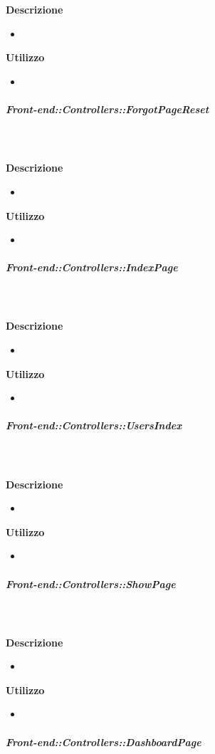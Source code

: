         \textbf{\\ \\ Descrizione} 
          \begin{itemize}
            \item[] 
          \end{itemize}      
        \textbf{Utilizzo}  
          \begin{itemize}
            \item[] 
          \end{itemize}
      \subparagraph{Front-end::Controllers::ForgotPageReset}
        
        \textbf{\\ \\ Descrizione} 
          \begin{itemize}
            \item[] 
          \end{itemize}      
        \textbf{Utilizzo}  
          \begin{itemize}
            \item[] 
          \end{itemize}
      \subparagraph{Front-end::Controllers::IndexPage}
        
        \textbf{\\ \\ Descrizione} 
          \begin{itemize}
            \item[] 
          \end{itemize}      
        \textbf{Utilizzo}  
          \begin{itemize}
            \item[] 
          \end{itemize}
      \subparagraph{Front-end::Controllers::UsersIndex}
        
        \textbf{\\ \\ Descrizione} 
          \begin{itemize}
            \item[] 
          \end{itemize}      
        \textbf{Utilizzo}  
          \begin{itemize}
            \item[] 
          \end{itemize}
      \subparagraph{Front-end::Controllers::ShowPage}
        
        \textbf{\\ \\ Descrizione} 
          \begin{itemize}
            \item[] 
          \end{itemize}      
        \textbf{Utilizzo}  
          \begin{itemize}
            \item[] 
          \end{itemize}
      \subparagraph{Front-end::Controllers::DashboardPage}
        
